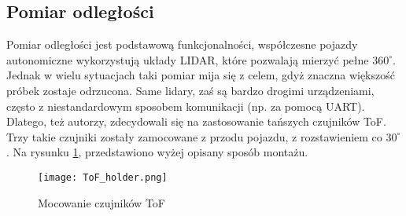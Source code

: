 
    \subsection{Pomiar odległości}
        Pomiar odległości jest podstawową funkcjonalności, współczesne pojazdy autonomiczne wykorzystują układy LIDAR, które pozwalają mierzyć pełne $360^\circ$.
        Jednak w wielu sytuacjach taki pomiar mija się z celem, gdyż znaczna większość próbek zostaje odrzucona.
        Same lidary, zaś są bardzo drogimi urządzeniami, często z niestandardowym sposobem komunikacji (np. za pomocą UART). 
        Dlatego, też autorzy, zdecydowali się na zastosowanie tańszych czujników ToF.
        Trzy takie czujniki zostały zamocowane z przodu pojazdu, z rozstawieniem co $30^\circ$.
        Na rysunku \ref{fig:ToF_holder}, przedstawiono wyżej opisany sposób montażu.
\newpage
        \begin{figure}[!ht]
            \centering
            \texttt{[image: ToF\_holder.png]}
            \caption{Mocowanie czujników ToF}
            \label{fig:ToF_holder}
        \end{figure}

